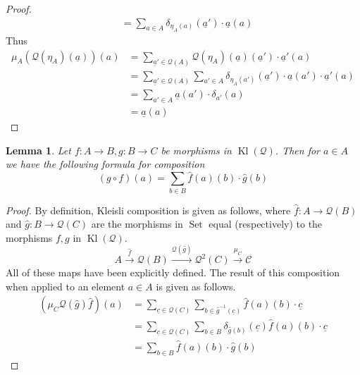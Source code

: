 \documentclass[12pt]{article}
\theoremstyle{plain}
\newtheorem{lemma}[thm]{Lemma}
\theoremstyle{definition}
\newcommand{\call}[1]{\mathcal{#1}}
\newcommand{\lto}{\longrightarrow}
\DeclareMathOperator{\set}{Set}
\begin{document}
\begin{proof}
\begin{align*}
	&= \sum_{a \in A}\delta_{\eta_A(a)}(\underline{a}')\cdot \underline{a}(a)
\end{align*}
Thus
\begin{align*}
	\mu_A(\call{Q}(\eta_A)(\underline{a}))(a) &= \sum_{\underline{a}' \in \call{Q}(A)}\call{Q}(\eta_A)(\underline{a})(\underline{a}')\cdot \underline{a}'(a)\\
	&= \sum_{\underline{a}' \in \call{Q}(A)}\sum_{a' \in A}\delta_{\eta_A(a')}(\underline{a}')\cdot \underline{a}(a')\cdot \underline{a}'(a)\\
	&= \sum_{a' \in A}\underline{a}(a') \cdot \delta_{a'}(a)\\
	&= \underline{a}(a)
\end{align*}
\end{proof}

\begin{lemma}\label{lem:additive_kleisli}
	Let $f: A \lto B, g: B \lto C$ be morphisms in $\operatorname{Kl}(\call{Q})$. Then for $a \in A$ we have the following formula for composition
	\begin{equation}\label{eq:composition_kl_Q}
		(g \circ f)(a) = \sum_{b \in B} \hat{f}(a)(b) \cdot \hat{g}(b)
	\end{equation}
\end{lemma}
\begin{proof}
	By definition, Kleisli composition is given as follows, where $\hat{f}: A \lto \call{Q}(B)$ and $\hat{g}: B \lto \call{Q}(C)$ are the morphisms in $\set$ equal (respectively) to the morphisms $f, g$ in $\operatorname{Kl}(\call{Q})$.
	\begin{equation}
		A \stackrel{\hat{f}}{\lto} \call{Q}(B) \stackrel{\call{Q}(\hat{g})}{\lto} \call{Q}^2(C) \stackrel{\mu_C}{\lto} \call{C}
	\end{equation}
	All of these maps have been explicitly defined. The result of this composition when applied to an element $a \in A$ is given as follows.
	\begin{align*}
		(\mu_C \call{Q}(\hat{g}) \hat{f})(a) &= \sum_{\underline{c} \in \call{Q}(C)}\sum_{b \in \hat{g}^{-1}(\underline{c})}\hat{f}(a)(b)\cdot \underline{c}\\
		&= \sum_{\underline{c} \in \call{Q}(C)}\sum_{b \in B}\delta_{\hat{g}(b)}(\underline{c})\hat{f}(a)(b) \cdot \underline{c}\\
		&= \sum_{b \in B}\hat{f}(a)(b) \cdot \hat{g}(b)
	\end{align*}
\end{proof}
\end{document}
